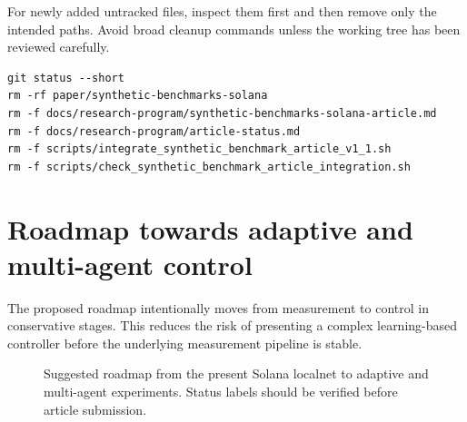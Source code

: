 \documentclass[11pt,a4paper]{article}
\begin{document}
For newly added untracked files, inspect them first and then remove only the intended paths. Avoid broad cleanup commands unless the working tree has been reviewed carefully.

\begin{verbatim}
git status --short
rm -rf paper/synthetic-benchmarks-solana
rm -f docs/research-program/synthetic-benchmarks-solana-article.md
rm -f docs/research-program/article-status.md
rm -f scripts/integrate_synthetic_benchmark_article_v1_1.sh
rm -f scripts/check_synthetic_benchmark_article_integration.sh
\end{verbatim}

\section{Roadmap towards adaptive and multi-agent control}
\label{sec:roadmap}

The proposed roadmap intentionally moves from measurement to control in conservative stages. This reduces the risk of presenting a complex learning-based controller before the underlying measurement pipeline is stable.

\begin{figure}[H]
\centering
{}
\caption{Suggested roadmap from the present Solana localnet to adaptive and multi-agent experiments. Status labels should be verified before article submission.}
\label{fig:roadmap}
\end{figure}
\end{document}
